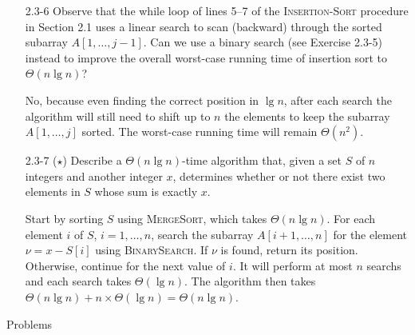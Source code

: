 \documentclass{report}
\makeatletter
\renewenvironment{framed}{%
 \def\FrameCommand##1{\hskip\@totalleftmargin
 \fboxsep=\FrameSep\fbox{##1}}%
 \MakeFramed {\advance\hsize-\width
   \@totalleftmargin\z@ \linewidth\hsize
   \@setminipage}}%
 {\par\unskip\endMakeFramed}
\makeatother
\begin{document}
\begin{enumerate}
\item[2.3{-}6]{Observe that the while loop of lines 5{--}7 of the
\textsc{Insertion-Sort} procedure in Section 2.1 uses a linear search to scan
(backward) through the sorted subarray $A[1, \dots, j - 1]$. Can we use a binary
search (see Exercise 2.3-5) instead to improve the overall worst-case running
time of insertion sort to $\Theta(n \lg n)$?}

\begin{framed}
No, because even finding the correct position in $\lg n$, after each search the
algorithm will still need to shift up to $n$ the elements to keep the subarray
$A[1, \dots, j]$ sorted. The worst-case running time will remain $\Theta(n^2)$.
\end{framed}

\item[2.3{-}7]{($\star$) Describe a $\Theta(n \lg n)$-time algorithm that, given a set
$S$ of $n$ integers and another integer $x$, determines whether or not there
exist two elements in $S$ whose sum is exactly $x$.}

\begin{framed}
Start by sorting $S$ using \textsc{MergeSort}, which takes $\Theta(n \lg n)$.
For each element $i$ of $S$, $i = 1, \dots, n$, search the subarray $A[i + 1,
\dots, n]$ for the element $\nu = x - S[i]$ using \textsc{BinarySearch}. If
$\nu$ is found, return its position. Otherwise, continue for the next value of
$i$. It will perform at most $n$ searchs and each search takes $\Theta(\lg n)$.
The algorithm then takes $\Theta(n \lg n) + n \times \Theta(\lg n) = \Theta(n
\lg n)$.
\end{framed}

\end{enumerate}

\pagebreak

{\large Problems}
\end{document}

